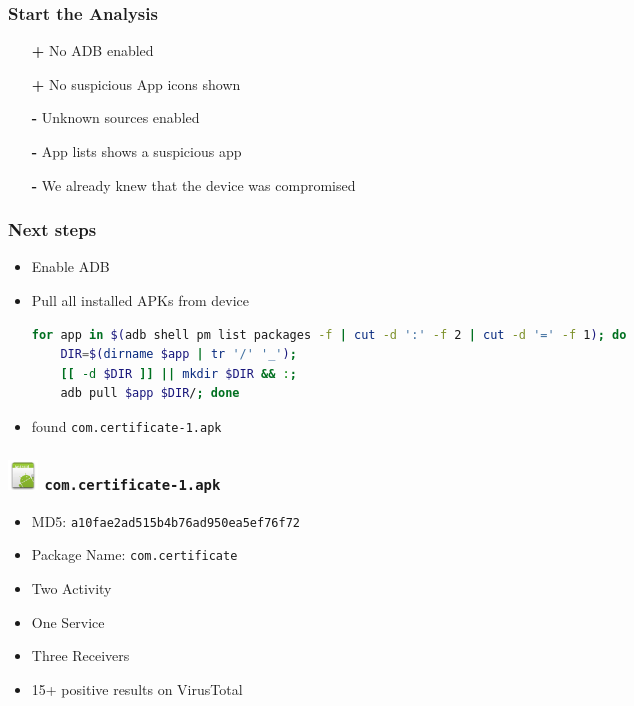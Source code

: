 \documentclass[12pt,a4paper]{beamer}
\begin{document}
\begin{frame}
\frametitle{Start the Analysis}
\begin{itemize}
	\item[\textbf{\color{green}+}] No ADB enabled
	\item[\textbf{\color{green}+}] No suspicious App icons shown
	\item[\textbf{\color{red}-}] Unknown sources enabled 
	\item[\textbf{\color{red}-}] App lists shows a suspicious app
	\item[\textbf{\color{red}-}] We already knew that the device was compromised
\end{itemize}
\end{frame}

\begin{frame}[fragile]
	\frametitle{Next steps}
	
	\begin{itemize}
		\item Enable ADB
		\item Pull all installed APKs from device
	
	\begin{lstlisting}[language=bash]
	for app in $(adb shell pm list packages -f | cut -d ':' -f 2 | cut -d '=' -f 1); do 
	DIR=$(dirname $app | tr '/' '_'); 
	[[ -d $DIR ]] || mkdir $DIR && :; 
	adb pull $app $DIR/; done
	\end{lstlisting}

	\item found \texttt{com.certificate-1.apk}
	\end{itemize}	
\end{frame}

\newcommand{\certificateIcon}{\includegraphics[keepaspectratio=true,height=0.8cm]{images/icon.png} \texttt{com.certificate-1.apk}}

\begin{frame}
\frametitle{\certificateIcon}
	
	\begin{itemize}
		\item MD5: \texttt{a10fae2ad515b4b76ad950ea5ef76f72}
		\item Package Name: \texttt{com.certificate}
		\item Two Activity
		\item One Service
		\item Three Receivers
		\item 15+ positive results on VirusTotal
	\end{itemize}

\end{frame}
\end{document}
